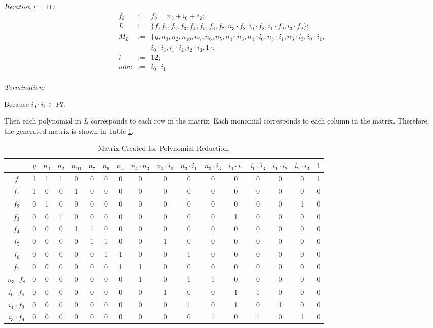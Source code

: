 \begin{Example}
	{\it Iteration $i=11$:}
	\begin{eqnarray}
		f_{k}&:=&f_{9}=n_3+i_0+i_2; \nonumber \\
		L&:=&\{ f,f_1,f_{2},f_{3},f_{4},f_{5},f_{6},f_{7},n_3 \cdot f_{8}, i_{0} \cdot f_{8},i_1 \cdot f_{9}, i_3 \cdot f_{9}\}; \nonumber \\
		M_{L}&:=&\{ y,n_0,n_2,n_{10},n_7,n_6,n_5,n_4\cdot n_3,n_4\cdot i_0, n_3\cdot i_1,n_3\cdot i_3,i_0\cdot i_1,\nonumber \\
		&{}&i_0\cdot i_3, i_1\cdot i_2,i_2\cdot i_3,1\}; \nonumber \\
		i&:=&12;  \nonumber \\
		mon&:=& i_0\cdot i_1 \nonumber 
	\end{eqnarray}\\
	
	{\it Termination:}
	
	Because $i_0\cdot i_1  \subset PI$.
	
	Then each polynomial in $L$ corresponds to each row in the matrix.
	Each monomial corresponds to each column in the matrix.
	Therefore, the generated matrix is shown in Table \ref{tab:matrixcons}.
	
	\begin{table} 
	\begin{center}
	\caption{Matrix Created for Polynomial Reduction.} 
	\label{tab:matrixcons}
	\begin{tabular}{|c||c|c|c|c|c|c|c|c|c|c|c|c|c|c|c|c|} \hline 
				&$y$ 	&$n_0$ &$n_2$	&$n_{10}$	 &$n_7$	&$n_6$  &$n_5$   &$n_4\cdot n_3$  &$n_4\cdot i_0$ 	&$n_3\cdot i_1$	&$n_3\cdot i_3$	&$i_0\cdot i_1$		&$i_0\cdot i_3$ 	&$i_1\cdot i_2$	 &$i_2\cdot i_3$   &$1$ \\
		\hline
		$f$   		&1	&1	&1	&0		&0	&0	&0	&0	&0	&0	&0	&0	&0	&0	&0	&1 \\
		\hline
		$f_1$ 		&1	&0	&0	&1		&0	&0	&0	&0	&0	&0	&0	&0	&0	&0	&0	&0 \\
		\hline
		$f_2$ 		&0	&1	&0	&0		&0	&0	&0	&0	&0	&0	&0	&0	&0	&0	&1	&0 \\
		\hline
		$f_3$		&0	&0	&1	&0		&0	&0	&0	&0	&0	&0	&0	&1	&0	&0	&0	&0 \\
		\hline
		$f_4$		&0	&0	&0	&1		&1	&0	&0	&0	&0	&0	&0	&0	&0	&0	&0	&0\\
		\hline{}
		$f_5$		&0	&0	&0	&0		&1	&1	&0	&0	&1	&0	&0	&0	&0	&0	&0	&0\\
		\hline{}
		$f_6$		&0	&0	&0	&0		&0	&1	&1	&0	&0	&1	&0	&0	&0	&0	&0	&0\\
		\hline{}
		$f_7$		&0	&0	&0	&0		&0	&0	&1	&1	&0	&0	&0	&0	&0	&0	&0	&0\\
	\hline{}
$n_3\cdot f_{8}$	&0	&0	&0	&0		&0	&0	&0	&1	&0	&1	&1	&0	&0	&0	&0	&0\\
	\hline{}
$i_0\cdot f_{8}$ 	&0	&0	&0	&0		&0	&0	&0	&0	&1	&0	&0	&1	&1	&0	&0	&0\\
	\hline{}
$i_1 \cdot f_{9}$	&0	&0	&0	&0		&0	&0	&0	&0	&0	&1	&0	&1	&0	&1	&0	&0\\
	\hline{}
$i_3 \cdot f_{9}$	&0	&0	&0	&0		&0	&0	&0	&0	&0	&0	&1	&0	&1	&0	&1	&0\\
	\hline
	\end{tabular}
	\end{center}
	\end{table} 
	

\end{Example}
